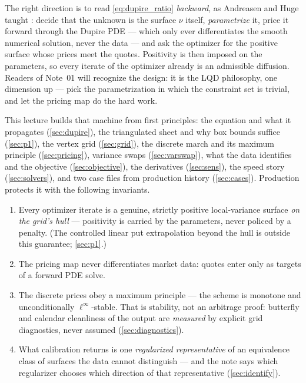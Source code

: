 \documentclass[11pt]{article}
\begin{document}
The right direction is to read \eqref{eq:dupire_ratio} \emph{backward}, as
Andreasen and Huge taught \cite{AndreasenHuge2011}: decide that the unknown
is the surface $\nu$ itself, \emph{parametrize} it, price it forward through
the Dupire PDE --- which only ever differentiates the smooth numerical
solution, never the data --- and ask the optimizer for the positive surface
whose prices meet the quotes.  Positivity is then imposed on the parameters,
so every iterate of the optimizer already is an admissible diffusion.
Readers of Note~01 will recognize the design: it is the LQD philosophy, one
dimension up --- pick the parametrization in which the constraint set is
trivial, and let the pricing map do the hard work.

This lecture builds that machine from first principles: the equation and
what it propagates (\cref{sec:dupire}), the triangulated sheet and why box
bounds suffice (\cref{sec:p1}), the vertex grid (\cref{sec:grid}), the
discrete march and its maximum principle (\cref{sec:pricing}), variance
swaps (\cref{sec:varswap}), what the data identifies and the objective
(\cref{sec:objective}), the derivatives (\cref{sec:sens}), the speed story
(\cref{sec:solvers}), and two case files from production history
(\cref{sec:cases}).  Production protects it with the following invariants.

\begin{invariant}
\begin{enumerate}[leftmargin=1.6em]
\item Every optimizer iterate is a genuine, strictly positive local-variance
surface \emph{on the grid's hull} --- positivity is carried by the
parameters, never policed by a penalty.  (The controlled linear put
extrapolation beyond the hull is outside this guarantee; \cref{sec:p1}.)
\item The pricing map never differentiates market data: quotes enter only as
targets of a forward PDE solve.
\item The discrete prices obey a maximum principle --- the scheme is
monotone and unconditionally $\ell^\infty$-stable.  That is stability, not
an arbitrage proof: butterfly and calendar cleanliness of the output are
\emph{measured} by explicit grid diagnostics, never assumed
(\cref{sec:diagnostics}).
\item What calibration returns is one \emph{regularized representative} of
an equivalence class of surfaces the data cannot distinguish --- and the
note says which regularizer chooses which direction of that representative
(\cref{sec:identify}).
\end{enumerate}
\end{invariant}
\end{document}
